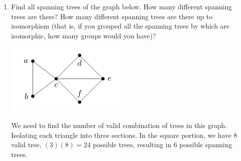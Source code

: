 \documentclass[11pt,a4paper]{article}
\newcommand\setItemNumber[1]{\setcounter{enumi}{\numexpr#1-1\relax}}
\begin{document}
\begin{enumerate}
        \setItemNumber{13} 
        \item Find all spanning trees of the graph below. How many different spanning trees are there? How many different spanning trees are there up to isomorphism (that is, if you grouped all the spanning trees by which are isomorphic, how many groups would you have)?\\

            \begin{center}
            \includegraphics[width=.45\textwidth]{hw8_graphic2}
            \end{center}

            We need to find the number of valid combination of trees in this graph. Isolating each triangle into three sections. In the square portion, we have 8 valid tree, $(3)(8) = 24$ possible trees, resulting in 6 possible spanning trees.

        \end{enumerate}
	
	
	
		
\end{document}
